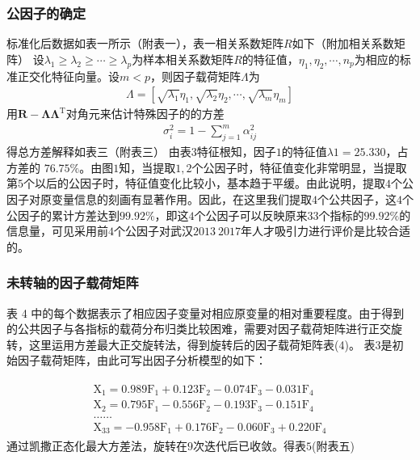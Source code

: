 \documentclass{whutmod}
\begin{document}
	\subsubsection{公因子的确定}
	标准化后数据如表一所示（附表一），表一相关系数矩阵$R$如下（附加相关系数矩阵）
	设$\lambda_{1} \geqslant \lambda_{2} \geqslant \cdots \geqslant \lambda_{p}$为样本相关系数矩阵$R$的特征值，$\eta _ { 1 } , \eta _ { 2 } , \cdots , n _ { p }$为相应的标准正交化特征向量。设$m<p$，则因子载荷矩阵$\Lambda$为
	\begin{gather}
	\Lambda=\left[\sqrt{\lambda_{1}} \eta_{1}, \sqrt{\lambda_{2}} \eta_{2}, \cdots, \sqrt{\lambda_{m}} \eta_{m}\right]
	\end{gather}
    用$\boldsymbol{R}-\boldsymbol{\Lambda} \boldsymbol{\Lambda}^{\mathrm{T}}$对角元来估计特殊因子的的方差
	\begin{gather}
	\sigma_{i}^{2}=1-\sum_{j=1}^{m} \alpha_{i j}^{2}
	\end{gather}
	得总方差解释如表三（附表三）
	由表$3$特征根知，因子$1$的特征值$λ1=25.330$，占方差的 $76.75\%$。由图$1$知，当提取$1,2$个公因子时，特征值变化非常明显，当提取第$5$个以后的公因子时，特征值变化比较小，基本趋于平缓。由此说明，提取$4$个公因子对原变量信息的刻画有显著作用。因此，在这里我们提取$4$个公共因子，这$4$个公因子的累计方差达到$99.92\%$，即这$4$个公因子可以反映原来$33$个指标的$99.92\%$的信息量，可见采用前$4$个公因子对武汉$2013~2017$年人才吸引力进行评价是比较合适的。
	\subsubsection{未转轴的因子载荷矩阵}
	表 4 中的每个数据表示了相应因子变量对相应原变量的相对重要程度。由于得到的公共因子与各指标的载荷分布归类比较困难，需要对因子载荷矩阵进行正交旋转，这里运用方差最大正交旋转法，得到旋转后的因子载荷矩阵表(4)。
	表$3$是初始因子载荷矩阵，由此可写出因子分析模型的如下：
	
	\begin{gather}
	\begin{array} { l } { \mathrm { X } _ { 1 } = 0.989 \mathrm { F } _ { 1 } + 0.123 \mathrm { F } _ { 2 } - 0.074 \mathrm { F } _ { 3 } - 0.031 \mathrm { F } _ { 4 } } \\ { \mathrm { X } _ { 2 } = 0.795 \mathrm { F } _ { 1 } - 0.556 \mathrm { F } _ { 2 } - 0.193 \mathrm { F } _ { 3 } - 0.151 \mathrm { F } _ { 4 } } \\ { \ldots \ldots } \\ { \mathrm { X } _ { 33 } = - 0.958 \mathrm { F } _ { 1 } + 0.176 \mathrm { F } _ { 2 } - 0.060 \mathrm { F } _ { 3 } + 0.220 \mathrm { F } _ { 4 } } \end{array}
	\end{gather}
	通过凯撒正态化最大方差法，旋转在$9$次迭代后已收敛。得表$5$(附表五)
	
\end{document}

